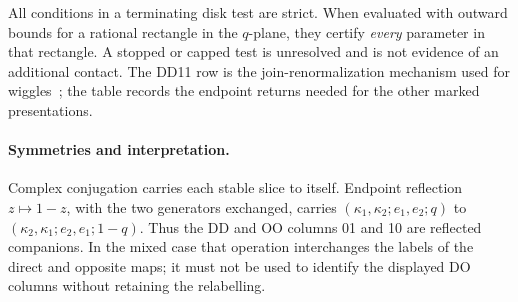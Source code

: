 All conditions in a terminating disk test are strict. When evaluated
with outward bounds for a rational rectangle in the $q$-plane, they
certify \emph{every} parameter in that rectangle. A stopped or capped
test is unresolved and is not evidence of an additional contact.
The DD11 row is the join-renormalization mechanism used for
wiggles~\cite{Calegari2026}; the table records the endpoint returns
needed for the other marked presentations.

\paragraph{Symmetries and interpretation.}
Complex conjugation carries each stable slice to itself. Endpoint
reflection $z\mapsto1-z$, with the two generators exchanged, carries
$(\kappa_1,\kappa_2;e_1,e_2;q)$ to
$(\kappa_2,\kappa_1;e_2,e_1;1-q)$. Thus the DD and OO columns 01 and 10
are reflected companions. In the mixed case that operation interchanges
the labels of the direct and opposite maps; it must not be used to
identify the displayed DO columns without retaining the relabelling.



